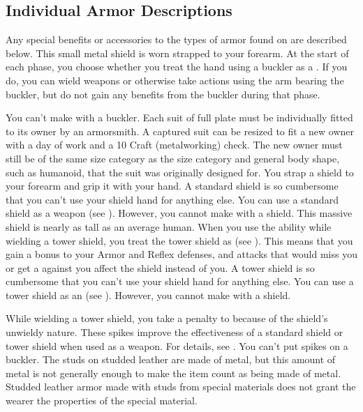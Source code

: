   \subsection{Individual Armor Descriptions}
    Any special benefits or accessories to the types of armor found on  are described below.
     This small metal shield is worn strapped to your forearm.
    At the start of each phase, you choose whether you treat the hand using a buckler as a .
    If you do, you can wield weapons or otherwise take actions using the arm bearing the buckler, but do not gain any benefits from the buckler during that phase.
    \par You can't make  with a buckler.
     Each suit of full plate must be individually fitted to its owner by an armorsmith.
    A captured suit can be resized to fit a new owner with a day of work and a  10 Craft (metalworking) check.
    The new owner must still be of the same size category as the size category and general body shape, such as humanoid, that the suit was originally designed for.
     You strap a shield to your forearm and grip it with your hand.
    A standard shield is so cumbersome that you can't use your shield hand for anything else.
    You can use a standard shield as a weapon (see ).
    However, you cannot make  with a shield.
     This massive shield is nearly as tall as an average human.
    When you use the  ability while wielding a tower shield, you treat the tower shield as  (see ).
    This means that you gain a  bonus to your Armor and Reflex defenses, and attacks that would miss you or get a  against you affect the shield instead of you.
    A tower shield is so cumbersome that you can't use your shield hand for anything else.
    You can use a tower shield as an  (see ).
    However, you cannot make  with a shield.

    While wielding a tower shield, you take a  penalty to  because of the shield's unwieldy nature.
     These spikes improve the effectiveness of a standard shield or tower shield when used as a weapon.
    For details, see .
    You can't put spikes on a buckler.
     The studs on studded leather are made of metal, but this amount of metal is not generally enough to make the item count as being made of metal.
    Studded leather armor made with studs from special materials does not grant the wearer the properties of the special material.

